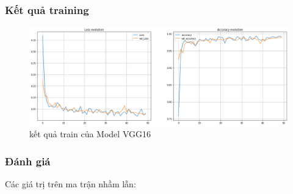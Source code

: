 \subsubsection{Kết quả training}
\begin{center}
    \begin{figure}[!h]
        \centering
        \includegraphics[scale = 0.38]{fileanh/23.png}
        \caption{kết quả train của Model VGG16}
    \end{figure}
\end{center}\newpage
\subsubsection{Đánh giá}
Các giá trị trên ma trận nhầm lẫn:

